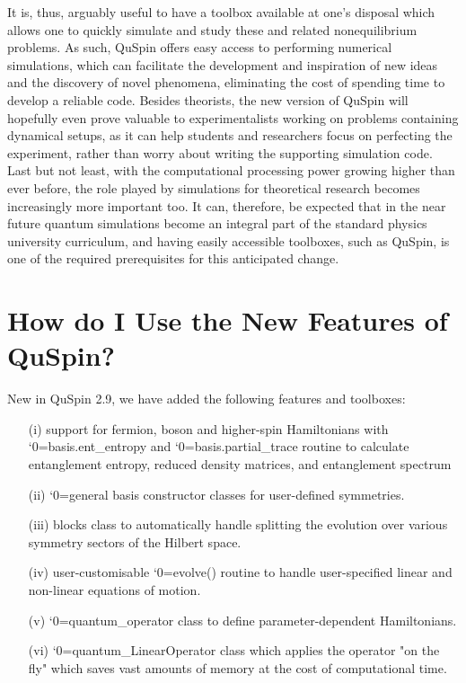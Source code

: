 \documentclass{SciPost}
\newcommand\0{\scalebox{-1}[1]{0}}
\let\svttfamily\ttfamily
\renewcommand\ttfamily{\svttfamily\catcode`0=\active }
\renewcommand\texttt{\bgroup\ttfamily\texttthelp}
\def\texttthelp#1{#1\egroup}
\begin{document}
It is, thus, arguably useful to have a toolbox available at one's disposal which allows one to quickly simulate and study these and related nonequilibrium problems. As such, QuSpin offers easy access to performing numerical simulations, which can facilitate the development and inspiration of new ideas and the discovery of novel phenomena, eliminating the cost of spending time to develop a reliable code. Besides theorists, the new version of QuSpin will hopefully even prove valuable to experimentalists working on problems containing dynamical setups, as it can help students and researchers focus on perfecting the experiment, rather than worry about writing the supporting simulation code. Last but not least, with the computational processing power growing higher than ever before, the role played by simulations for theoretical research becomes increasingly more important too. It can, therefore, be expected that in the near future quantum simulations become an integral part of the standard physics university curriculum, and having easily accessible toolboxes, such as QuSpin, is one of the required prerequisites for this anticipated change.


\section{How do I Use the New Features of QuSpin?}
\label{sec:examples}

New in QuSpin 2.9, we have added the following features and toolboxes:
\begin{itemize}
	\item[(i)] support for fermion, boson and higher-spin Hamiltonians with \texttt{basis.ent\_entropy} and \texttt{basis.partial\_trace} routine to calculate entanglement entropy, reduced density matrices, and entanglement spectrum
	\item[(ii)] \texttt{general} basis constructor classes for user-defined symmetries.
	\item[(iii)] blocks class to automatically handle splitting the evolution over various symmetry sectors of the Hilbert space.
	\item[(iv)] user-customisable \texttt{evolve()} routine to handle user-specified linear and non-linear equations of motion.
	\item[(v)] \texttt{quantum\_operator} class to define parameter-dependent Hamiltonians.
	\item[(vi)] \texttt{quantum\_LinearOperator} class which applies the operator "on the fly" which saves vast amounts of memory at the cost of computational time. 
\end{itemize}
\end{document}
